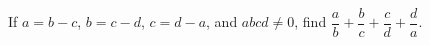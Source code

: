 If $a=b-c$, $b=c-d$, $c=d-a$, and $abcd\ne0$, find $\dfrac{a}{b}+\dfrac{b}{c}+\dfrac{c}{d}+\dfrac{d}{a}$.
